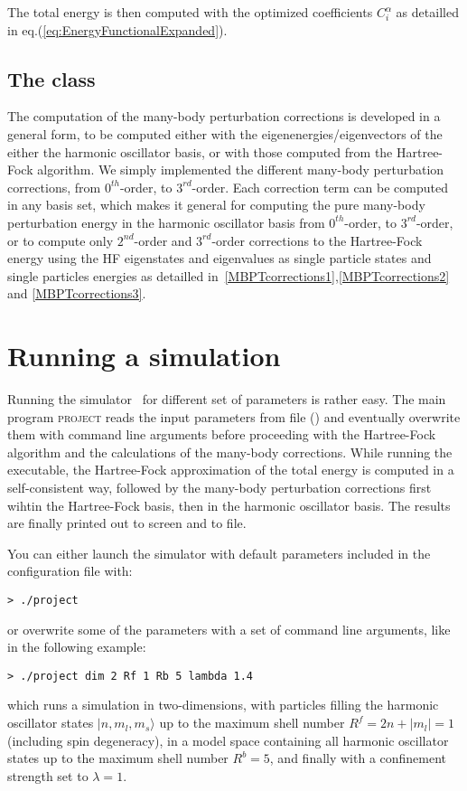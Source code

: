 The total energy is then computed with the optimized coefficients $C_i^{\alpha}$ as detailled in eq.(\ref{eq:EnergyFunctionalExpanded}).


\subsection{The  class}

The computation of the many-body perturbation corrections is developed in a general form, to be computed  either with the eigenenergies/eigenvectors of the either the harmonic oscillator basis, or with those computed from the Hartree-Fock algorithm. We simply implemented the different many-body perturbation corrections, from $0^{th}$-order, to $3^{rd}$-order.
Each correction term can be computed in any basis set, which makes it general for computing the pure many-body perturbation energy in the harmonic oscillator basis from $0^{th}$-order, to $3^{rd}$-order, or to compute only $2^{nd}$-order and $3^{rd}$-order corrections to the Hartree-Fock energy using the HF eigenstates and eigenvalues as single particle states and single particles energies as detailled in~\ref{MBPTcorrections1},\ref{MBPTcorrections2} and \ref{MBPTcorrections3}.

\section{Running a simulation}
\label{sec:run}
Running the simulator~\cite{codeLink} for different set of parameters is rather easy. The main program \textsc{project} reads the input parameters from file () and eventually overwrite them with command line arguments before proceeding with the Hartree-Fock algorithm and the calculations of the many-body corrections. While running the executable, the Hartree-Fock approximation of the total energy is computed in a self-consistent way, followed by the many-body perturbation corrections first wihtin the Hartree-Fock basis, then in the harmonic oscillator basis. The results are finally printed out to screen and to file.

You can either launch the simulator with default parameters included in the configuration file with:
\begin{verbatim}
> ./project
\end{verbatim}
or overwrite some of the parameters with a set of command line arguments, like in the following example:
\begin{verbatim}
> ./project dim 2 Rf 1 Rb 5 lambda 1.4
\end{verbatim}
which runs a simulation in two-dimensions, with particles filling the harmonic oscillator states $|n,m_l,m_s \rangle$ up to the maximum shell number $R^f=2n+|m_l|=1$ (including spin degeneracy), in a model space containing all harmonic oscillator states up to the maximum shell number $R^b=5$, and finally with a confinement strength set to $\lambda=1$.

